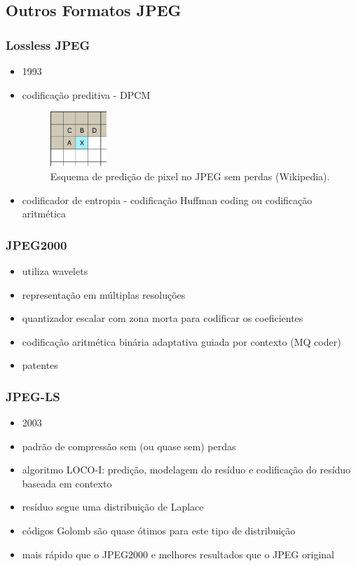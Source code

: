 \subsection{Outros Formatos JPEG}
\begin{frame}%
  \frametitle{Lossless JPEG}
  \begin{itemize}
  \item 1993
  \item codificação preditiva - DPCM
        \begin{figure}[h!]
        \centering
        \includegraphics[width=0.2\textwidth]{images/pixelprediction.pdf}
        \caption{Esquema de predição de pixel no JPEG sem perdas (Wikipedia).}
        \label{fig:pixelprediction}
        \end{figure}
  \item codificador de entropia - codificação Huffman coding ou codificação aritmética
  \end{itemize}
\end{frame}

\begin{frame}%
  \frametitle{JPEG2000}
  \begin{itemize}
  \item utiliza wavelets
  \item representação em múltiplas resoluções
  \item quantizador escalar com zona morta para codificar os coeficientes
  \item codificação aritmética binária adaptativa guiada por contexto (MQ coder)
  \item patentes
  \end{itemize}
\end{frame}

\begin{frame}%
  \frametitle{JPEG-LS}
  \begin{itemize}
  \item 2003
  \item padrão de compressão sem (ou quase sem) perdas
  \item algoritmo LOCO-I: predição, modelagem do resíduo e codificação do resíduo baseada em contexto
  \item resíduo segue uma distribuição de Laplace
  \item códigos Golomb são quase ótimos para este tipo de distribuição
  \item mais rápido que o JPEG2000 e melhores resultados que o JPEG original
  \end{itemize}
\end{frame}

